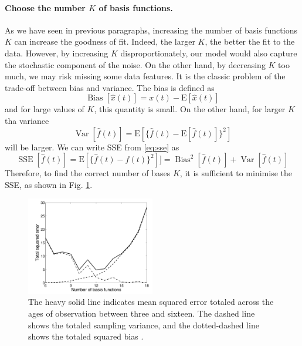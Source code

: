 \paragraph{Choose the number $K$ of basis functions.} As we have seen in previous paragraphs, increasing the number of basis functions $K$ can increase the goodness of fit. Indeed, the larger $K$, the better the fit to the data. However, by increasing $K$ disproportionately, our model would also capture the stochastic component of the noise. On the other hand, by decreasing $K$ too much, we may risk missing some data features. It is the classic problem of the trade-off between bias and variance. The bias is defined as
\begin{equation}
    \label{eq:bias}
    \operatorname{Bias}[\hat{x}(t)]=x(t)-\mathrm{E}[\hat{x}(t)]
\end{equation}
and for large values of $K$, this quantity is small. On the other hand, for larger $K$ tha variance
\begin{equation}
    \label{eq:variance}
    \operatorname{Var}[\hat{f}(t)]=\mathrm{E}\left[\{\hat{f}(t)-\mathrm{E}[\hat{f}(t)]\}^2\right]
\end{equation}
will be larger. We can write SSE from \ref{eq:sse} as 
\begin{equation}
    \label{eq:ssebias}
    \operatorname{SSE}[\hat{f}(t)]=\mathrm{E}\left[\{\hat{f}(t)-f(t)\}^2\right]] = \operatorname{Bias}^2[\hat{f}(t)]+\operatorname{Var}[\hat{f}(t)]
\end{equation}
Therefore, to find the correct number of bases $K$, it is sufficient to minimise the SSE, as shown in Fig. \ref{fig:tradeoff}.
\begin{figure}
\centering
\includegraphics[width=0.5\textwidth]{Images/tradeoff.png}
\caption[Bias variance trade-off.]{The heavy solid line indicates mean squared error totaled across the ages of observation between three and sixteen. The dashed line shows the totaled sampling variance, and the dotted-dashed line shows the totaled squared bias \cite{ramsay_functional_2006}.}
\label{fig:tradeoff}
\end{figure}
